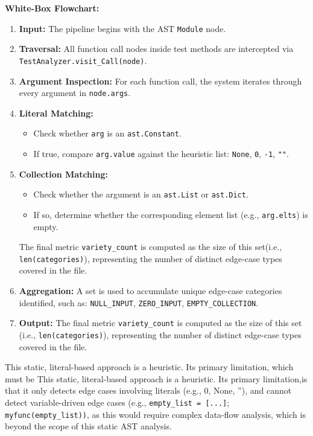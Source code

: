 \documentclass[conference]{IEEEtran}
\begin{document}
    \textbf{White-Box Flowchart:}
    \begin{enumerate}
    \item \textbf{Input:} The pipeline begins with the AST \texttt{Module} node.
    \item \textbf{Traversal:}  
    All function call nodes inside test methods are intercepted via  
    \texttt{TestAnalyzer.visit\_Call(node)}.
    \item \textbf{Argument Inspection:}  
    For each function call, the system iterates through every argument in  
    \texttt{node.args}.
    \item \textbf{Literal Matching:}
    \begin{itemize}
    \item Check whether \texttt{arg} is an \texttt{ast.Constant}.
     \item If true, compare \texttt{arg.value} against the heuristic list:
     \texttt{None}, \texttt{0}, \texttt{-1}, \texttt{""}.
    \end{itemize}

    \item \textbf{Collection Matching:}
    \begin{itemize}
    \item Check whether the argument is an \texttt{ast.List} or \texttt{ast.Dict}.
     \item If so, determine whether the corresponding element list (e.g., \texttt{arg.elts}) is empty.
    \end{itemize}
    The final metric \texttt{variety\_count} is computed as the size of this set(i.e., \texttt{len(categories)}), representing the number of distinct  
    edge-case types covered in the file.

    \item \textbf{Aggregation:}  
    A set is used to accumulate unique edge-case categories identified, such as:  
    \texttt{NULL\_INPUT}, \texttt{ZERO\_INPUT}, \texttt{EMPTY\_COLLECTION}.

    \item \textbf{Output:}  
    The final metric \texttt{variety\_count} is computed as the size of this set  
    (i.e., \texttt{len(categories)}), representing the number of distinct  
    edge-case types covered in the file.
\end{enumerate}

This static, literal-based approach is a heuristic. Its primary limitation, which must be This static, literal-based approach is a heuristic. Its primary limitation,is that it only detects edge cases involving literals (e.g., 0, None, ''), and cannot detect variable-driven edge cases (e.g., \texttt{empty\_list = [...]}; \texttt{myfunc(empty\_list))}, as this would require complex data-flow analysis, which is beyond the scope of this static AST analysis.
\end{document}
